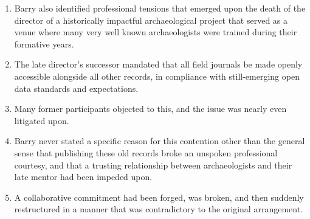 \documentclass{article}
\begin{document}
\begin{enumerate}
  \item Barry also identified professional tensions that emerged upon the death of the director of a historically impactful archaeological project that served as a venue where many very well known archaeologists were trained during their formative years.
  \item The late director's successor mandated that all field journals be made openly accessible alongside all other records, in compliance with still-emerging open data standards and expectations.
  \item Many former participants objected to this, and the issue was nearly even litigated upon.
  \item Barry never stated a specific reason for this contention other than the general sense that publishing these old records broke an unspoken professional courtesy, and that a trusting relationship between archaeologists and their late mentor had been impeded upon.
  \item A collaborative commitment had been forged, was broken, and then suddenly restructured in a manner that was contradictory to the original arrangement.
\end{enumerate}
\end{document}
